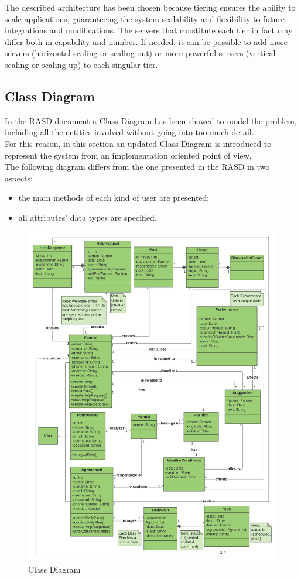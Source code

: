 The described architecture has been chosen because tiering ensures the ability to scale applications, guaranteeing the system scalability and flexibility to future integrations and modifications.
The servers that constitute each tier in fact may differ both in capability and number. If needed, it can be possible to add more servers (horizontal scaling or scaling out) or more powerful servers (vertical scaling or scaling up) to each singular tier.  

\subsection{Class Diagram}
In the RASD document a Class Diagram has been showed to model the problem, including all the entities involved without going into too much detail.\\
For this reason, in this section an updated Class Diagram is introduced to represent the system from an  implementation oriented point of view. \\

The following diagram differs from the one presented in the RASD in two aspects:
\begin{itemize}
    \item the main methods of each kind of user are presented;
    \item all attributes' data types are specified.
\end{itemize}

\begin{figure}[H]
  \includegraphics[width=125.5mm,scale=0.9]{./Images/Class Diagram.png}
  \caption{Class Diagram}
\end{figure}

\newpage